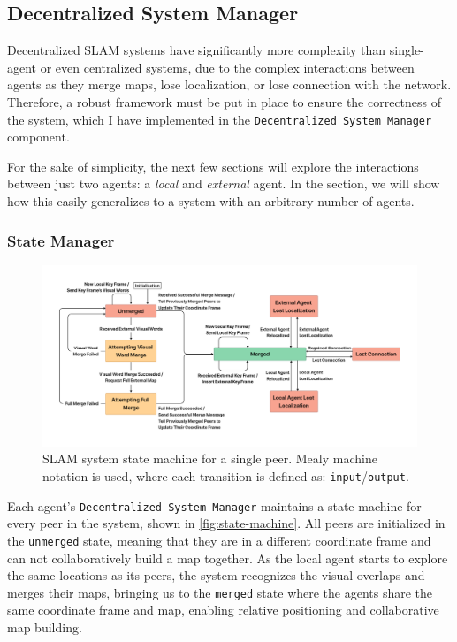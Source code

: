 \subsection{Decentralized System Manager}
\label{sec:decentralized-system-manager}
Decentralized SLAM systems have significantly more complexity than single-agent or even centralized systems, due to the complex interactions between agents as they merge maps, lose localization, or lose connection with the network. Therefore, a robust framework must be put in place to ensure the correctness of the system, which I have implemented in the \texttt{Decentralized System Manager} component.

For the sake of simplicity, the next few sections will explore the interactions between just two agents: a \textit{local} and \textit{external} agent. In the  section, we will show how this easily generalizes to a system with an arbitrary number of agents.

\subsubsection{State Manager}
\label{sec:state-manager}

\begin{figure}[h]
    \centering
    \includegraphics[trim=5cm 5cm 5cm 5cm, width=\linewidth]{figures/slam_system_state_machine.pdf}
    \caption{SLAM system state machine for a single peer. Mealy machine notation is used, where each transition is defined as: \texttt{input}/\texttt{output}.}
    \label{fig:state-machine}
\end{figure}

Each agent's \texttt{Decentralized System Manager} maintains a state machine for every peer in the system, shown in \autoref{fig:state-machine}. All peers are initialized in the \texttt{unmerged} state, meaning that they are in a different coordinate frame and can not collaboratively build a map together. As the local agent starts to explore the same locations as its peers, the system recognizes the visual overlaps and merges their maps, bringing us to the \texttt{merged} state where the agents share the same coordinate frame and map, enabling relative positioning and collaborative map building.

